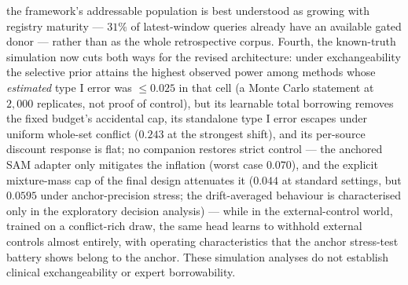 \documentclass[11pt]{article}
\begin{document}
the framework's
addressable population is best understood as growing with registry maturity
--- $31\%$ of latest-window queries already have an available gated donor ---
rather than as the whole retrospective corpus. Fourth, the known-truth
simulation now cuts both ways for the revised architecture: under
exchangeability the selective prior attains the highest observed power
among methods whose \emph{estimated} type I error was $\le 0.025$ in that
cell (a Monte Carlo statement at $2{,}000$ replicates, not proof of
control), but its learnable total borrowing
removes the fixed budget's accidental cap, its standalone type I error
escapes under uniform whole-set conflict ($0.243$ at the strongest shift),
and its per-source discount response is flat; no companion restores strict
control --- the anchored SAM adapter only mitigates the inflation (worst
case $0.070$), and the explicit mixture-mass cap of the final design
attenuates it ($0.044$ at standard settings, but $0.0595$ under
anchor-precision stress; the drift-averaged behaviour is characterised
only in the exploratory decision analysis) --- while in the
external-control world, trained on a conflict-rich draw, the same head
learns to withhold external controls almost entirely, with operating
characteristics that the anchor stress-test battery shows belong to the
anchor. These
simulation analyses do not
establish clinical exchangeability or expert borrowability.
\end{document}
